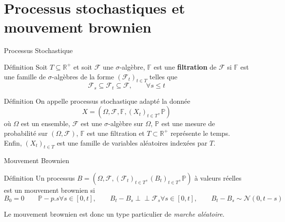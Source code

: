 \documentclass{beamer}
\newcommand{\1}{\mathmybb{1}}
\newcommand{\indep}{\perp \!\!\! \perp}
\begin{document}
\section{Processus stochastiques et mouvement brownien}
\begin{frame}{Processus Stochastique}
  \begin{block}{Définition}
    Soit $T \subseteq \mathbb{R}^{+}$ et soit $\mathcal{F}$ une $\sigma$-algèbre, $\mathbb{F}$ est une \textbf{filtration} de $\mathcal{F}$ si $\mathbb{F}$ est une famille de $\sigma$-algèbres de la forme $\left( \mathcal{F}_{t}\right)_{t\in T}$ telles que
    \[
      \mathcal{F}_{s} \subseteq \mathcal{F}_{t} \subseteq \mathcal{F}, \qquad \forall s \leq t
    \]
    \end{block}
  \begin{block}{Définition}
    On appelle processus stochastique adapté la donnée
    \begin{equation}
      X = (\varOmega, \mathcal{F}, \mathbb{F}, \left(  X_{t} \right)_{t\in T}, \mathbb{P})
    \end{equation}
    où $ \varOmega $ est un ensemble, $ \mathcal{F} $ est une $\sigma$-algèbre sur $ \varOmega $, $\mathbb{P}$ est une mesure de probabilité sur $ \left( \varOmega , \mathcal{F} \right)$, $\mathbb{F}$ est une filtration et $T \subset \mathbb{R}^{+}$ représente le temps.
    Enfin, $\left( X_{t} \right)_{t\in T} $  est une famille de variables aléatoires indexées par $ T $.
  \end{block}
\end{frame}
\begin{frame}{Mouvement Brownien}
  \begin{block}{Définition}
    Un processus $ B = (\varOmega, \mathcal{F}, \left(  \mathcal{F}_{t} \right)_{t\in T},\left(  B_{t} \right)_{t\in T}, \mathbb{P} ) $ à valeurs réelles est un mouvement brownien si
    \begin{subequations}
      \begin{equation} B_{0} = 0 \qquad \mathbb{P}-p.s \end{equation}
      \begin{equation} \forall s \in \left[0, t\right], \qquad B_{t} - B_{s} \indep \mathcal{F}_{s} \end{equation}
      \begin{equation} \forall s \in \left[0, t\right], \qquad B_{t} - B_{s} \sim \mathcal{N} \left( 0, t-s\right)\end{equation}
      \end{subequations}
    \end{block}
    Le mouvement brownien est donc un type particulier de {\em marche aléatoire}.
\end{frame}
\end{document}
